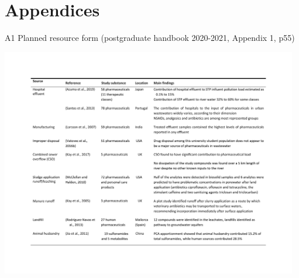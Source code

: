 \documentclass{article}
\begin{document}


\clearpage
%





\clearpage
{}
\section*{Appendices}
\begin{table}[!h]
    \centering
    \caption{A1 Planned resource form (postgraduate handbook 2020-2021, Appendix 1, p55)}
    \includegraphics[page=6,width=13cm,trim=2cm 3cm 3cm 3cm, clip]{just tables.pdf}
    \label{table_planned_resource}
\end{table}
\end{document}
